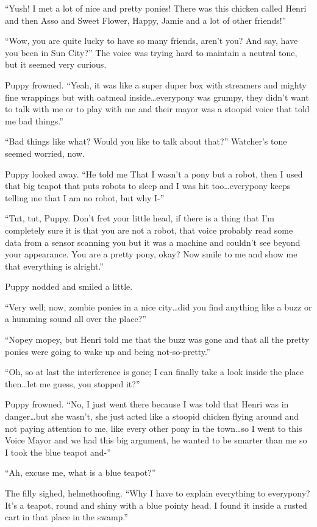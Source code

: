 ``Yush! I met a lot of nice and pretty ponies! There was this chicken called Henri and then Asso and Sweet Flower, Happy, Jamie and a lot of other friends!''

``Wow, you are quite lucky to have so many friends, aren't you? And say, have you been in Sun City?'' The voice was trying hard to maintain a neutral tone, but it seemed very curious.

Puppy frowned. ``Yeah, it was like a super duper box with streamers and mighty fine wrappings but with oatmeal inside\dots everypony was grumpy, they didn't want to talk with me or to play with me and their mayor was a stoopid voice that told me bad things.''

``Bad things like what? Would you like to talk about that?'' Watcher's tone seemed worried, now.

Puppy looked away. ``He told me That I wasn't a pony but a robot, then I used that big teapot that puts robots to sleep and I was hit too\dots everypony keeps telling me that I am no robot, but why I-''

``Tut, tut, Puppy. Don't fret your little head, if there is a thing that I'm completely sure it is that you are not a robot, that voice probably read some data from a sensor scanning you but it was a machine and couldn't see beyond your appearance. You are a pretty pony, okay? Now smile to me and show me that everything is alright.''

Puppy nodded and smiled a little.

``Very well; now, zombie ponies in a nice city\dots did you find anything like a buzz or a humming sound all over the place?''

``Nopey mopey, but Henri told me that the buzz was gone and that all the pretty ponies were going to wake up and being not-so-pretty.''

``Oh, so at last the interference is gone; I can finally take a look inside the place then\dots let me guess, you stopped it?''

Puppy frowned. ``No, I just went there because I was told that Henri was in danger\dots but she wasn't, she just acted like a stoopid chicken flying around and not paying attention to me, like every other pony in the town\dots so I went to this Voice Mayor and we had this big argument, he wanted to be smarter than me so I took the blue teapot and-''

``Ah, excuse me, what is a blue teapot?''

The filly sighed, helmethoofing. ``Why I have to explain everything to everypony? It's a teapot, round and shiny with a blue pointy head. I found it inside a rusted cart in that place in the swamp.''

